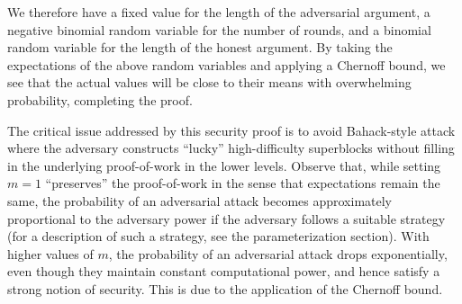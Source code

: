 We therefore have a fixed value for the length of the adversarial argument, a
negative binomial random variable for the number of rounds, and a binomial
random variable for the length of the honest argument. By taking the
expectations of the above random variables and applying a Chernoff bound, we see
that the actual values will be close to their means with overwhelming
probability, completing the proof.

\begin{remark}
\label{rmk.variance}
The critical issue addressed by this security proof is to avoid Bahack-style
attack \cite{bahack} where the adversary constructs ``lucky'' high-difficulty
superblocks without filling in the underlying proof-of-work in the lower
levels. Observe that, while setting $m = 1$ ``preserves'' the proof-of-work in
the sense that expectations remain the same, the probability of an adversarial
attack becomes approximately proportional to the adversary power if the
adversary follows a suitable strategy (for a description of such a strategy,
see the parameterization section). With higher values of $m$, the probability of
an adversarial attack drops exponentially, even though they maintain constant
computational power, and hence satisfy a strong notion of security. This is due
to the application of the Chernoff bound.
\end{remark}
